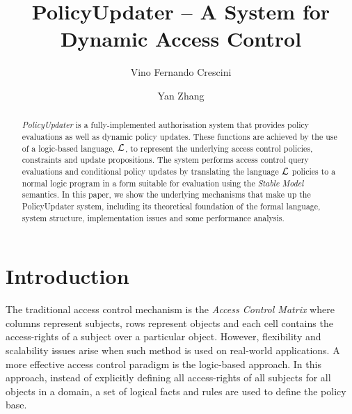 \documentclass[glov2,twocolumn,final]{svjour2}
\begin{document}
  \title{PolicyUpdater -- A System for Dynamic Access Control}
  \author{Vino Fernando Crescini \and Yan Zhang}
  \date{\notused}
  \maketitle

  \begin{abstract}
    {\em PolicyUpdater} is a fully-implemented authorisation system that
    provides policy evaluations as well as dynamic policy updates. These
    functions are achieved by the use of a logic-based language, ${\cal L}$, to
    represent the underlying access control policies, constraints and update
    propositions. The system performs access control query evaluations and
    conditional policy updates by translating the language $\cal{L}$ policies
    to a normal logic program in a form suitable for evaluation using the
    {\em Stable Model} semantics. In this paper, we show the underlying
    mechanisms that make up the PolicyUpdater system, including its theoretical
    foundation of the formal language, system structure, implementation issues
    and some performance analysis.
  \end{abstract}


  \section{Introduction}

    The traditional access control mechanism is the {\em Access Control Matrix}
    where columns represent subjects, rows represent objects and each cell
    contains the access-rights of a subject over a particular object. However,
    flexibility and scalability issues arise when such method is used on
    real-world applications. A more effective access control paradigm is the
    logic-based approach. In this approach, instead of explicitly defining all
    access-rights of all subjects for all objects in a domain, a set of logical
    facts and rules are used to define the policy base.
\end{document}
